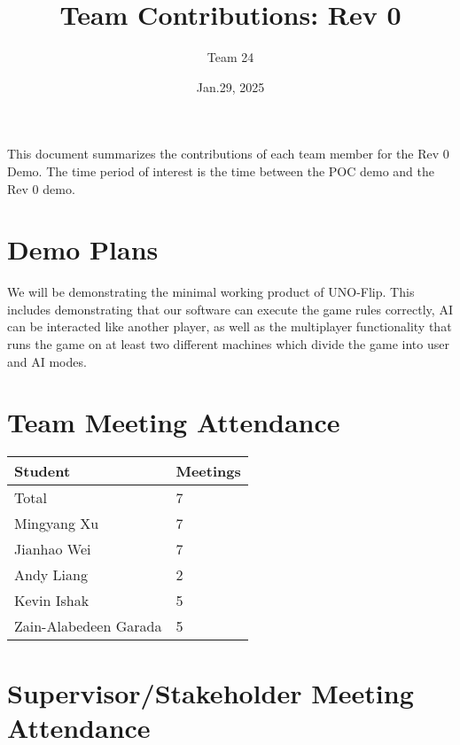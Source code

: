\documentclass{article}
\title{Team Contributions: Rev 0\\\progname}
\author{\authname Team 24}
\date{Jan.29, 2025}
\begin{document}
\maketitle

This document summarizes the contributions of each team member for the Rev 0
Demo.  The time period of interest is the time between the POC demo and the Rev
0 demo.

\section{Demo Plans}

We will be demonstrating the minimal working product of UNO-Flip. This includes demonstrating that our software can execute the game rules correctly, AI can be interacted like another player, as well as the multiplayer functionality that runs the game on at least two different machines which divide the game into user and AI modes.

\section{Team Meeting Attendance}


\begin{table}[H]
\centering
\begin{tabular}{ll}
\toprule
\textbf{Student} & \textbf{Meetings}\\
\midrule
Total & 7\\
Mingyang Xu& 7\\
Jianhao Wei & 7\\
Andy Liang & 2\\
Kevin Ishak & 5\\
Zain-Alabedeen Garada & 5\\
\bottomrule
\end{tabular}
\end{table}


\section{Supervisor/Stakeholder Meeting Attendance}
\end{document}
